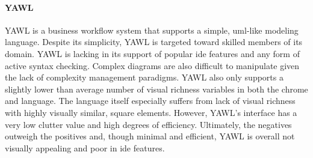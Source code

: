\paragraph{YAWL} YAWL is a business workflow system that supports a simple,
\acs{uml}-like modeling language. Despite its simplicity, YAWL is targeted
toward skilled members of its domain. YAWL is lacking in its support of
popular \ac{ide} features and any form of active syntax checking. Complex
diagrams are also difficult to manipulate given the lack of complexity
management paradigms.  YAWL also only supports a slightly lower than
average number of visual richness variables in both the chrome and
language. The language itself especially suffers from lack of visual
richness with highly visually similar, square elements. However, YAWL's
interface has a very low clutter value and high degrees of efficiency.
Ultimately, the negatives outweigh the positives and, though minimal and
efficient, YAWL is overall not visually appealing and poor in \ac{ide} features.

